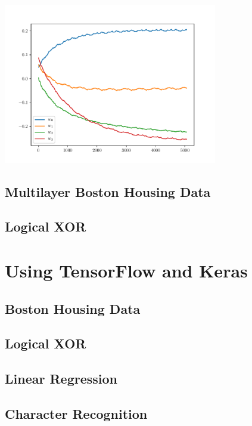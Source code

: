 \begin{center}
    \includegraphics[width=0.7\textwidth]{../Code/BostonHousingResult.pdf}
\end{center}


\subsection{Multilayer Boston Housing Data}

\subsection{Logical XOR}

\section{Using TensorFlow and Keras}

\subsection{Boston Housing Data}

\subsection{Logical XOR}

\subsection{Linear Regression}

\subsection{Character Recognition}
